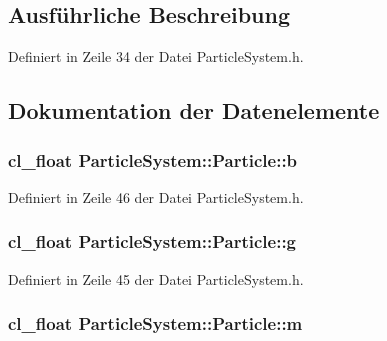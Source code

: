 \subsection{Ausführliche Beschreibung}


Definiert in Zeile 34 der Datei Particle\-System.\-h.



\subsection{Dokumentation der Datenelemente}
\hypertarget{structParticleSystem_1_1Particle_a8c154d57bf01ee548a4463a6d8305ea0}{
\subsubsection[{b}]{\setlength{\rightskip}{0pt plus 5cm}cl\-\_\-float Particle\-System\-::\-Particle\-::b}}\label{structParticleSystem_1_1Particle_a8c154d57bf01ee548a4463a6d8305ea0}


Definiert in Zeile 46 der Datei Particle\-System.\-h.

\hypertarget{structParticleSystem_1_1Particle_a4106a1dd76569af880e0ceddba6b4079}{
\subsubsection[{g}]{\setlength{\rightskip}{0pt plus 5cm}cl\-\_\-float Particle\-System\-::\-Particle\-::g}}\label{structParticleSystem_1_1Particle_a4106a1dd76569af880e0ceddba6b4079}


Definiert in Zeile 45 der Datei Particle\-System.\-h.

\hypertarget{structParticleSystem_1_1Particle_aec139286a2e70167504ac55dae4fdabe}{
\subsubsection[{m}]{\setlength{\rightskip}{0pt plus 5cm}cl\-\_\-float Particle\-System\-::\-Particle\-::m}}\label{structParticleSystem_1_1Particle_aec139286a2e70167504ac55dae4fdabe}


